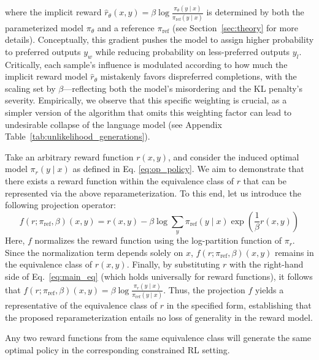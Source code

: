 where the implicit reward $\hat{r}_\theta(x, y) = \beta \log \frac{\pi_\theta(y \mid x)}{\pi_\text{ref}(y \mid x)}$ is determined by both the parameterized model $\pi_\theta$ and a reference $\pi_\text{ref}$ (see Section~\ref{sec:theory} for more details). Conceptually, this gradient pushes the model to assign higher probability to preferred outputs $y_w$ while reducing probability on less-preferred outputs $y_l$. Critically, each sample's influence is modulated according to how much the implicit reward model $\hat{r}_\theta$ mistakenly favors dispreferred completions, with the scaling set by $\beta$—reflecting both the model's misordering and the KL penalty's severity. Empirically, we observe that this specific weighting is crucial, as a simpler version of the algorithm that omits this weighting factor can lead to undesirable collapse of the language model (see Appendix Table~\ref{tab:unlikelihood_generations}).

\begin{sproof}
    Take an arbitrary reward function $r(x, y)$, and consider the induced optimal model $\pi_r(y \mid x)$ as defined in Eq. \ref{eq:op_policy}. We aim to demonstrate that there exists a reward function within the equivalence class of $r$ that can be represented via the above reparameterization. To this end, let us introduce the following projection operator:
\begin{equation}
    f(r; \pi_\text{ref}, \beta)(x, y) = r(x, y) - \beta\log\sum_{y}\pi_\text{ref}(y\mid x)\exp\left(\frac{1}{\beta}r(x, y)\right)
\end{equation}
Here, $f$ normalizes the reward function using the log-partition function of $\pi_r$. Since the normalization term depends solely on $x$, $f(r; \pi_\text{ref}, \beta)(x, y)$ remains in the equivalence class of $r(x, y)$. Finally, by substituting $r$ with the right-hand side of Eq.~\ref{eq:main_eq} (which holds universally for reward functions), it follows that $f(r; \pi_\text{ref}, \beta)(x, y) = \beta \log \frac{\pi_r(y\mid x)}{\pi_\text{ref}(y\mid x)}$. Thus, the projection $f$ yields a representative of the equivalence class of $r$ in the specified form, establishing that the proposed reparameterization entails no loss of generality in the reward model.
\end{sproof}



\begin{lemma}\label{lemma:same_policy}
    Any two reward functions from the same equivalence class will generate the same optimal policy in the corresponding constrained RL setting.
\end{lemma}

